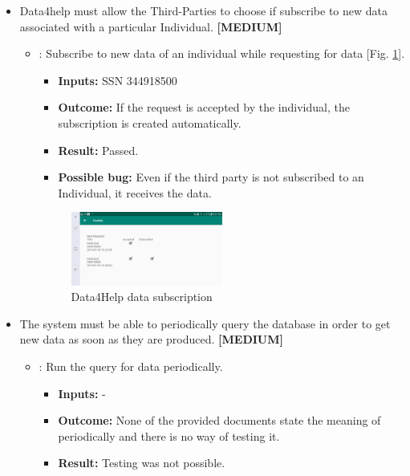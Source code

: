 \documentclass[a4paper, hidelinks, 12pt]{report}
\newcommand\requirement[1]{\item[{[REQ-#1]}] }
\newcommand\test[1]{\item[{[TEST-#1]}] }
\begin{document}
\begin{itemize}
\begin{itemize}
	\end{itemize}

	
	\requirement{12} Data4help must allow the Third-Parties to choose if subscribe to new data associated with a particular Individual. \textbf{[MEDIUM]}
	
			
				\begin{itemize}
		\test{11}: Subscribe to new data of an individual while requesting for data [Fig. \ref{fig:data_subscription}].
			\begin{itemize}
			\item \textbf{Inputs: } SSN 344918500			
			\item \textbf{Outcome: } If the request is accepted by the individual, the subscription is created automatically.
			\item \textbf{Result: } Passed.
			\item \textbf{Possible bug: } Even if the third party is not subscribed to an Individual, it receives the data.
			\end{itemize}
						
		\begin{figure}[H]
					\centering
				\includegraphics[width=0.5\textwidth]{images/data_subscription.jpeg}
					\caption[Data4Help data subscription]{Data4Help data subscription}
				\label{fig:data_subscription}
			\end{figure}
			
		
	\end{itemize}
	
	\requirement{13} The system must be able to periodically query the database in order to get new data as soon as they are produced. \textbf{[MEDIUM]}
	
			
				\begin{itemize}
		\test{12}: Run the query for data periodically.
			\begin{itemize}
			\item \textbf{Inputs: } -			
			\item \textbf{Outcome: } None of the provided documents state the meaning of periodically and there is no way of testing it.

			\item \textbf{Result: } Testing was not possible. 
			\end{itemize}
			

\end{itemize}
\end{itemize}
\end{document}
